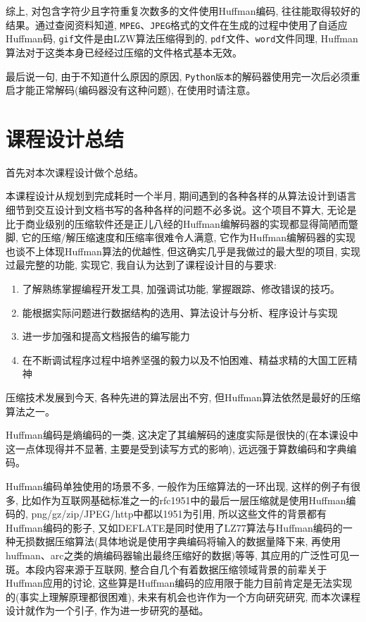 \documentclass[a4paper]{ctexart}
\begin{document}
综上, 对包含字符少且字符重复次数多的文件使用Huffman编码, 往往能取得较好的结果。通过查阅资料知道,
\texttt{MPEG}、\texttt{JPEG}格式的文件在生成的过程中使用了自适应Huffman码, \texttt{gif}文件是由LZW算法压缩得到的, \texttt{pdf}文件、\texttt{word}文件同理, Huffman算法对于这类本身已经经过压缩的文件格式基本无效。

最后说一句, 由于不知道什么原因的原因, \texttt{Python版本}的解码器使用完一次后必须重启才能正常解码(编码器没有这种问题), 在使用时请注意。


\section{课程设计总结}\label{header-n431}

首先对本次课程设计做个总结。

本课程设计从规划到完成耗时一个半月, 期间遇到的各种各样的从算法设计到语言细节到交互设计到文档书写的各种各样的问题不必多说。这个项目不算大, 无论是比于商业级别的压缩软件还是正儿八经的Huffman编解码器的实现都显得简陋而蹩脚, 它的压缩/解压缩速度和压缩率很难令人满意, 它作为Huffman编解码器的实现也谈不上体现Huffman算法的优越性, 但这确实几乎是我做过的最大型的项目, 实现过最完整的功能, 实现它,
我自认为达到了课程设计目的与要求:

\begin{enumerate}
\def\labelenumi{\arabic{enumi}.}
\item
  了解熟练掌握编程开发工具, 加强调试功能, 掌握跟踪、修改错误的技巧。
\item
  能根据实际问题进行数据结构的选用、算法设计与分析、程序设计与实现
\item
  进一步加强和提高文档报告的编写能力
\item
  在不断调试程序过程中培养坚强的毅力以及不怕困难、精益求精的大国工匠精神
\end{enumerate}

压缩技术发展到今天, 各种先进的算法层出不穷, 但Huffman算法依然是最好的压缩算法之一。

Huffman编码是熵编码的一类, 这决定了其编解码的速度实际是很快的(在本课设中这一点体现得并不显著,
主要是受到读写方式的影响), 远远强于算数编码和字典编码。

Huffman编码单独使用的场景不多, 一般作为压缩算法的一环出现, 这样的例子有很多, 比如作为互联网基础标准之一的rfc1951中的最后一层压缩就是使用Huffman编码的, png/gz/zip/JPEG/http中都以1951为引用,
所以这些文件的背景都有Huffman编码的影子, 又如DEFLATE是同时使用了LZ77算法与Huffman编码的一种无损数据压缩算法(具体地说是使用字典编码将输入的数据量降下来, 再使用huffman、arc之类的熵编码器输出最终压缩好的数据)等等, 其应用的广泛性可见一斑。本段内容来源于互联网, 整合自几个有着数据压缩领域背景的前辈关于Huffman应用的讨论, 这些算是Huffman编码的应用限于能力目前肯定是无法实现的(事实上理解原理都很困难), 未来有机会也许作为一个方向研究研究, 而本次课程设计就作为一个引子, 作为进一步研究的基础。
\end{document}
